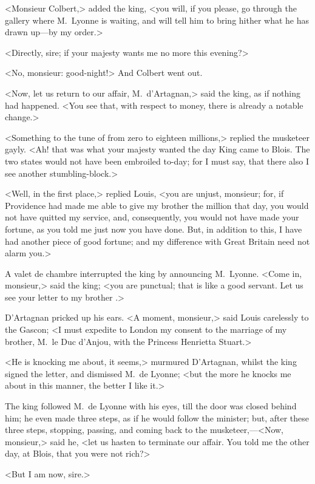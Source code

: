<Monsieur Colbert,> added the king, <you will, if you please, go through the gallery where M.~Lyonne is waiting, and will tell him to bring hither what he has drawn up—by my order.>

<Directly, sire; if your majesty wants me no more this evening?>

<No, monsieur: good-night!> And Colbert went out.

<Now, let us return to our affair, M.~d'Artagnan,> said the king, as if nothing had happened. <You see that, with respect to money, there is already a notable change.>

<Something to the tune of from zero to eighteen millions,> replied the musketeer gayly. <Ah! that was what your majesty wanted the day King  came to Blois. The two states would not have been embroiled to-day; for I must say, that there also I see another stumbling-block.>

<Well, in the first place,> replied Louis, <you are unjust, monsieur; for, if Providence had made me able to give my brother the million that day, you would not have quitted my service, and, consequently, you would not have made your fortune, as you told me just now you have done. But, in addition to this, I have had another piece of good fortune; and my difference with Great Britain need not alarm you.>

A valet de chambre interrupted the king by announcing M.~Lyonne. <Come in, monsieur,> said the king; <you are punctual; that is like a good servant. Let us see your letter to my brother .>

D'Artagnan pricked up his ears. <A moment, monsieur,> said Louis carelessly to the Gascon; <I must expedite to London my consent to the marriage of my brother, M.~le Duc d'Anjou, with the Princess Henrietta Stuart.>

<He is knocking me about, it seems,> murmured D'Artagnan, whilst the king signed the letter, and dismissed M.~de Lyonne; <but  the more he knocks me about in this manner, the better I like it.>

The king followed M.~de Lyonne with his eyes, till the door was closed behind him; he even made three steps, as if he would follow the minister; but, after these three steps, stopping, passing, and coming back to the musketeer,—<Now, monsieur,> said he, <let us hasten to terminate our affair. You told me the other day, at Blois, that you were not rich?>

<But I am now, sire.>

